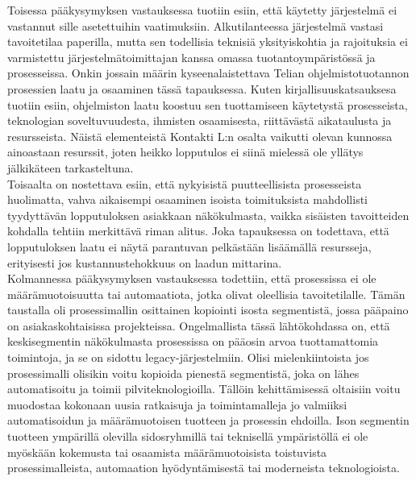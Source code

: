 \documentclass[finnish,12pt,a4paper,pdftex]{article}
\begin{document}
Toisessa pääkysymyksen vastauksessa tuotiin esiin, että käytetty järjestelmä ei vastannut sille asetettuihin vaatimuksiin. Alkutilanteessa järjestelmä vastasi tavoitetilaa paperilla, mutta sen todellisia teknisiä yksityiskohtia ja rajoituksia ei varmistettu järjestelmätoimittajan kanssa omassa tuotantoympäristössä ja prosesseissa. Onkin jossain määrin kyseenalaistettava Telian ohjelmistotuotannon prosessien laatu ja osaaminen tässä tapauksessa. Kuten kirjallisuuskatsauksesa tuotiin esiin, ohjelmiston laatu koostuu sen tuottamiseen käytetystä prosesseista, teknologian soveltuvuudesta, ihmisten osaamisesta, riittävästä aikataulusta ja resursseista. Näistä elementeistä Kontakti L:n osalta vaikutti olevan kunnossa ainoastaan resurssit, joten heikko lopputulos ei siinä mielessä ole yllätys jälkikäteen tarkasteltuna.\\

\noindent Toisaalta on nostettava esiin, että nykyisistä puutteellisista prosesseista huolimatta, vahva aikaisempi osaaminen isoista toimituksista mahdollisti tyydyttävän lopputuloksen asiakkaan näkökulmasta, vaikka sisäisten tavoitteiden kohdalla tehtiin merkittävä riman alitus. Joka tapauksessa on todettava, että lopputuloksen laatu ei näytä parantuvan pelkästään lisäämällä resursseja, erityisesti jos kustannustehokkuus on laadun mittarina.\\

Kolmannessa pääkysymyksen vastauksessa todettiin, että prosessissa ei ole määrämuotoisuutta tai automaatiota, jotka olivat oleellisia tavoitetilalle. Tämän taustalla oli prosessimallin osittainen kopiointi isosta segmentistä, jossa pääpaino on asiakaskohtaisissa projekteissa. Ongelmallista tässä lähtökohdassa on, että keskisegmentin näkökulmasta prosessissa on pääosin arvoa tuottamattomia toimintoja, ja se on sidottu legacy-järjestelmiin. Olisi mielenkiintoista jos prosessimalli olisikin voitu kopioida pienestä segmentistä, joka on lähes automatisoitu ja toimii pilviteknologioilla. Tällöin kehittämisessä oltaisiin voitu muodostaa kokonaan uusia ratkaisuja ja toimintamalleja jo valmiiksi automatisoidun ja määrämuotoisen tuotteen ja prosessin ehdoilla. Ison segmentin tuotteen ympärillä olevilla sidosryhmillä tai teknisellä ympäristöllä ei ole myöskään kokemusta tai osaamista määrämuotoisista toistuvista prosessimalleista, automaation hyödyntämisestä tai moderneista teknologioista.  \\
\end{document}
